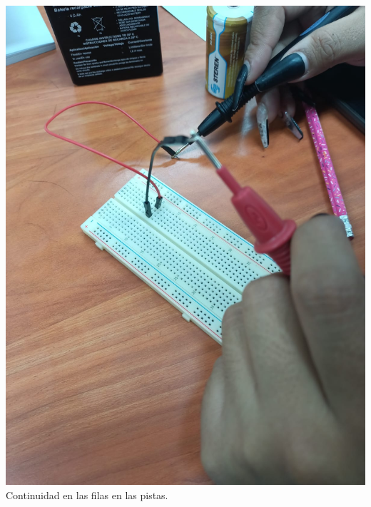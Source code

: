 \documentclass[10pt]{article}
\begin{document}
\begin{multicols}{2}
\begin{center}
	\includegraphics[scale = 0.1]{Imagenes/Fotos/ConFilas.jpeg}\\
	Continuidad en las filas en las pistas.

\end{center}
\end{multicols}
\end{document}
